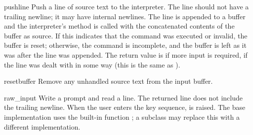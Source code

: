 \begin{methoddesc}[InteractiveConsole]{push}{line}
Push a line of source text to the interpreter.
The line should not have a trailing newline; it may have internal
newlines.  The line is appended to a buffer and the interpreter's
 method is called with the concatenated contents
of the buffer as source.  If this indicates that the command was
executed or invalid, the buffer is reset; otherwise, the command is
incomplete, and the buffer is left as it was after the line was
appended.  The return value is  if more input is required,
 if the line was dealt with in some way (this is the same as
).
\end{methoddesc}

\begin{methoddesc}[InteractiveConsole]{resetbuffer}{}
Remove any unhandled source text from the input buffer.
\end{methoddesc}

\begin{methoddesc}[InteractiveConsole]{raw_input}{}
Write a prompt and read a line.  The returned line does not include
the trailing newline.  When the user enters the \EOF{} key sequence,
 is raised.  The base implementation uses the
built-in function ; a subclass may replace this
with a different implementation.
\end{methoddesc}
